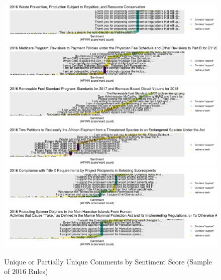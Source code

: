 \documentclass[
      12pt,
        ]{article}
\begin{document}
\begin{figure}
    \caption{Unique or Partially Unique Comments by Sentiment Score (Sample of 2016 Rules)}
    \label{fig:sentiment-2016}
    \centering
    \includegraphics[width = 7in]{../Figs/sent-2016BLM-2016-0001.png}
    \includegraphics[width = 7in]{../Figs/sent-2016CMS-2016-0116.png}
    \includegraphics[width = 7in]{../Figs/sent-2016EPA-HQ-OAR-2016-0004.png}
    \includegraphics[width = 7in]{../Figs/sent-2016FWS-HQ-ES-2016-0010.png}
    \includegraphics[width = 7in]{../Figs/sent-2016HHS-OS-2016-0014.png}
    \includegraphics[width = 7in]{../Figs/sent-2016NOAA-2005-0226.png}
\end{figure}

\clearpage
\newpage
\singlespacing 
           
   
\end{document}
